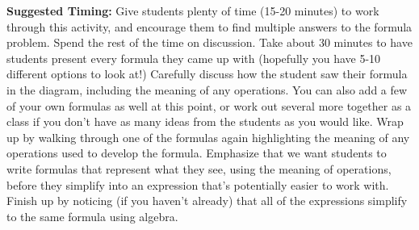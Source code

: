 \documentclass[nooutcomes,noauthor,handout]{ximera}
\begin{document}
\begin{instructorNotes}
{\bf Suggested Timing:} Give students plenty of time (15-20 minutes) to work through this activity, and encourage them to find multiple answers to the formula problem. Spend the rest of the time on discussion. Take about 30 minutes to have students present every formula they came up with (hopefully you have 5-10 different options to look at!) Carefully discuss how the student saw their formula in the diagram, including the meaning of any operations. You can also add a few of your own formulas as well at this point, or work out several more together as a class if you don't have as many ideas from the students as you would like. Wrap up by walking through one of the formulas again highlighting the meaning of any operations used to develop the formula. Emphasize that we want students to write formulas that represent what they see, using the meaning of operations, before they simplify into an expression that's potentially easier to work with. Finish up by noticing (if you haven't already) that all of the expressions simplify to the same formula using algebra.


\end{instructorNotes}
\end{document}
